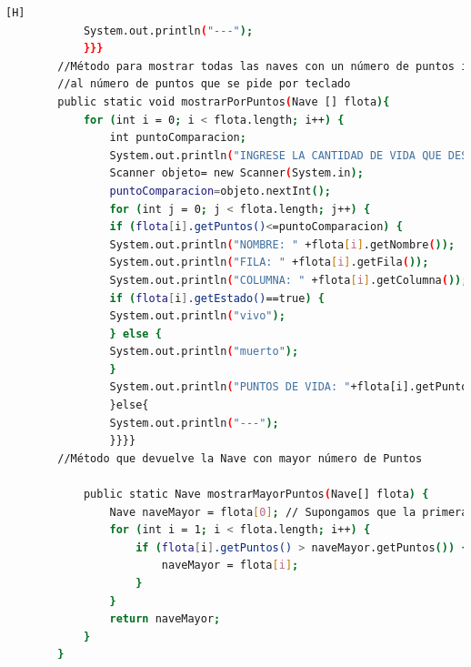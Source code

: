 \documentclass{article}
\begin{document}
\begin{lstlisting}[language=bash,caption={Creando la clase principal de DemoBatalla.java}][H]
			System.out.println("---");
			}}}
		//Método para mostrar todas las naves con un número de puntos inferior o igual
		//al número de puntos que se pide por teclado
		public static void mostrarPorPuntos(Nave [] flota){
			for (int i = 0; i < flota.length; i++) {
				int puntoComparacion;
				System.out.println("INGRESE LA CANTIDAD DE VIDA QUE DESEA COMPARAR");
				Scanner objeto= new Scanner(System.in);
				puntoComparacion=objeto.nextInt();
				for (int j = 0; j < flota.length; j++) {
				if (flota[i].getPuntos()<=puntoComparacion) {
				System.out.println("NOMBRE: " +flota[i].getNombre());
				System.out.println("FILA: " +flota[i].getFila());
				System.out.println("COLUMNA: " +flota[i].getColumna());
				if (flota[i].getEstado()==true) {
				System.out.println("vivo");
				} else {
				System.out.println("muerto");
				}
				System.out.println("PUNTOS DE VIDA: "+flota[i].getPuntos());
				}else{
				System.out.println("---");
				}}}}
		//Método que devuelve la Nave con mayor número de Puntos

			public static Nave mostrarMayorPuntos(Nave[] flota) {
			    Nave naveMayor = flota[0]; // Supongamos que la primera nave tiene la mayor cantidad de puntos inicialmente
			    for (int i = 1; i < flota.length; i++) {
			        if (flota[i].getPuntos() > naveMayor.getPuntos()) {
			            naveMayor = flota[i];
			        }
			    }
			    return naveMayor;
			}
		}
		
	\end{lstlisting}
\end{document}
